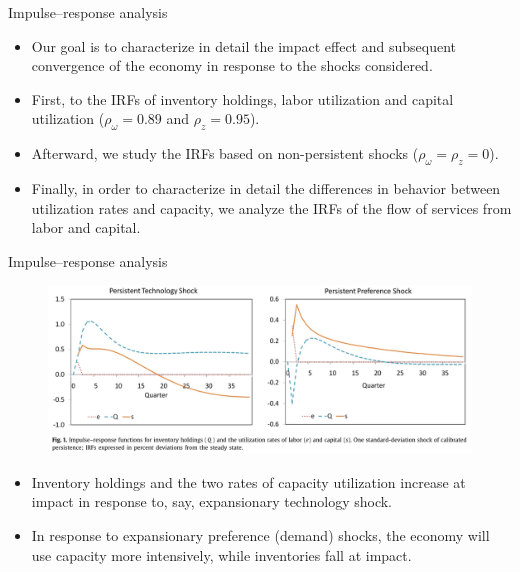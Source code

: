 \documentclass[fontset=windows,12pt,t,aspectratio=169]{beamer}
\begin{document}
\begin{frame}{Impulse–response analysis}
    \begin{itemize}
       \item  Our goal is to characterize in detail the impact effect and subsequent convergence of the economy in
response to the shocks considered.
       \item  First, to the IRFs of inventory holdings, labor utilization and capital utilization ($\rho_\omega = 0.89$ and $\rho_z = 0.95$).
       \item Afterward, we study the IRFs based on non-persistent shocks ($\rho_\omega = \rho_z = 0$).
       \item Finally, in order to characterize in detail the differences in behavior between utilization rates and capacity, we analyze the IRFs of the flow of services from labor and capital.
    \end{itemize}
\end{frame}

\begin{frame}{Impulse–response analysis}
    \begin{figure}
         \begin{center}
         \includegraphics[scale=0.45]{table/fig1.png}
         \end{center}
       \end{figure}
    \begin{itemize}
    \item Inventory holdings and the two rates of capacity utilization increase at impact in response to, say, expansionary technology shock.
    \item In response to expansionary preference (demand) shocks, the economy will use capacity more intensively, while inventories fall at impact.
    \end{itemize}
\end{frame}
\end{document}
